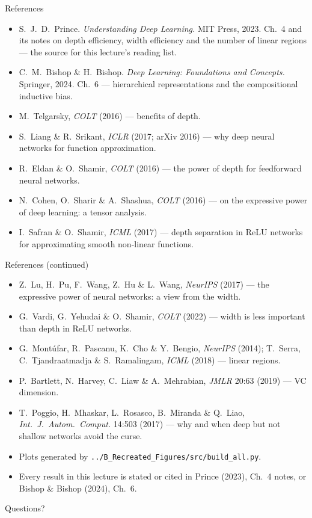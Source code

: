 \documentclass[aspectratio=169, 11pt]{beamer}
\begin{document}
\begin{frame}{References}
  \scriptsize
  \begin{itemize}\setlength{\itemsep}{1pt}
    \item S.~J.~D.~Prince. \textit{Understanding Deep Learning.}
          MIT Press, 2023. Ch.~4 and its notes on depth efficiency,
          width efficiency and the number of linear regions --- the
          source for this lecture's reading list.
    \item C.~M.~Bishop \& H.~Bishop. \textit{Deep Learning: Foundations
          and Concepts.} Springer, 2024. Ch.~6 --- hierarchical
          representations and the compositional inductive bias.
    \item M.~Telgarsky, \textit{COLT} (2016) --- benefits of depth.
    \item S.~Liang \& R.~Srikant, \textit{ICLR} (2017; arXiv 2016) ---
          why deep neural networks for function approximation.
    \item R.~Eldan \& O.~Shamir, \textit{COLT} (2016) --- the power of
          depth for feedforward neural networks.
    \item N.~Cohen, O.~Sharir \& A.~Shashua, \textit{COLT} (2016) ---
          on the expressive power of deep learning: a tensor analysis.
    \item I.~Safran \& O.~Shamir, \textit{ICML} (2017) --- depth
          separation in ReLU networks for approximating smooth
          non-linear functions.
  \end{itemize}
\end{frame}

\begin{frame}{References (continued)}
  \scriptsize
  \begin{itemize}\setlength{\itemsep}{1pt}
    \item Z.~Lu, H.~Pu, F.~Wang, Z.~Hu \& L.~Wang, \textit{NeurIPS}
          (2017) --- the expressive power of neural networks: a view
          from the width.
    \item G.~Vardi, G.~Yehudai \& O.~Shamir, \textit{COLT} (2022) ---
          width is less important than depth in ReLU networks.
    \item G.~Mont\'ufar, R.~Pascanu, K.~Cho \& Y.~Bengio,
          \textit{NeurIPS} (2014); T.~Serra, C.~Tjandraatmadja \&
          S.~Ramalingam, \textit{ICML} (2018) --- linear regions.
    \item P.~Bartlett, N.~Harvey, C.~Liaw \& A.~Mehrabian,
          \textit{JMLR} 20:63 (2019) --- VC dimension.
    \item T.~Poggio, H.~Mhaskar, L.~Rosasco, B.~Miranda \& Q.~Liao,
          \textit{Int.\ J.\ Autom.\ Comput.} 14:503 (2017) --- why and
          when deep but not shallow networks avoid the curse.
    \item Plots generated by
          \texttt{../B\_Recreated\_Figures/src/build\_all.py}.
    \item Every result in this lecture is stated or cited in Prince
          (2023), Ch.~4 notes, or Bishop \& Bishop (2024), Ch.~6.
  \end{itemize}
\end{frame}

\begin{frame}[standout]
  Questions?
\end{frame}
\end{document}
